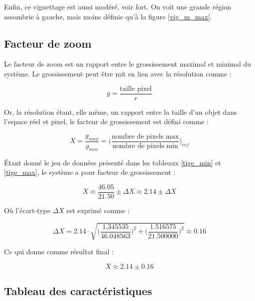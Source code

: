 \documentclass[11pt,letterpaper]{article}
\begin{document}
Enfin, ce vignettage est aussi modéré, voir fort. On voit une grande région 
assombrie à gauche, mais moins définie qu'à la figure \ref{vig_m_max}.

\subsection{Facteur de zoom}
Le facteur de zoom est un rapport entre le grossissement maximal et minimal du système. Le grossissement peut être mit en lien avec la résolution comme : 

\begin{equation*}
  g = \frac{\text{taille pixel}}{r}
\end{equation*}

Or, la résolution étant, elle même, un rapport entre la taille d'un objet dans l'espace réel et pixel, le facteur de grossissement est défini comme : 

\begin{equation*}
  X = \frac{g_{max}}{g_{min}} = \biggl(\frac{\text{nombre de pixels max}}{\text{nombre de pixels min}}\biggr)_{ref}
\end{equation*}

Étant donné le jeu de données présenté dans les tableaux \ref{tige_min} et \ref{tige_max}, le système a pour facteur de grossissement : 

\begin{equation*}
    X \approx \frac{46.05}{21.50} \pm \Delta X \approx 2.14 \pm \Delta X
\end{equation*}

Où l'écart-type $\Delta X$ est exprimé comme : 

\begin{equation*}
    \Delta X = 2.14 \cdot \sqrt{\biggl(\frac{1.345535}{46.048563}\biggr)^2 + \biggl(\frac{1.516575}{21.500000}\biggr)^2} \approx 0.16
\end{equation*}

Ce qui donne comme résultat final : 

\begin{equation*}
    X \approx 2.14 \pm 0.16
\end{equation*}

\subsection{Tableau des caractéristiques}
\end{document}
